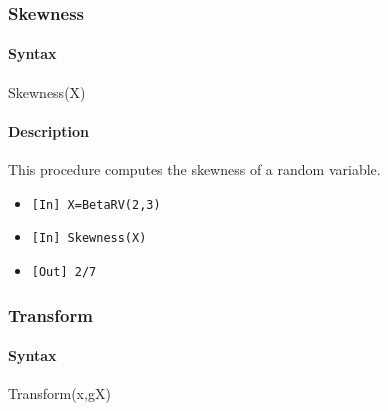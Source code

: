\documentclass[11pt,epsfig,psfig,doublespace,singlespace]{article}
\begin{document}
\subsubsection{Skewness}
\paragraph{Syntax} Skewness(X)
\paragraph{Description} This procedure computes the skewness of a random variable.
\begin{itemize}
\item \texttt{[In] X=BetaRV(2,3)}
\item \texttt{[In] Skewness(X)}
\item \texttt{[Out] 2/7}
\end{itemize}
\subsubsection{Transform}
\paragraph{Syntax} Transform(x,gX)
\end{document}
